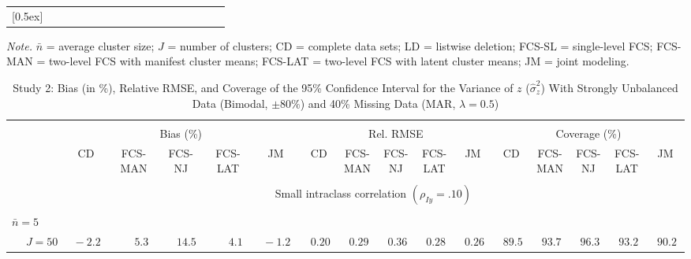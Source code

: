 \begin{sidewaystable}
\begin{threeparttable}
\begin{tabular}{llccccccccccccccc}
[0.5ex]\hline\\[-1.6ex] 
\end{tabular}
\begin{tablenotes}{\footnotesize \textit{Note.} $\bar{n}$ = average cluster size; $J$ = number of clusters; CD = complete data sets; LD = listwise deletion; FCS-SL = single-level FCS; FCS-MAN = two-level FCS with manifest cluster means; FCS-LAT = two-level FCS with latent cluster means; JM = joint modeling.}\end{tablenotes}
\end{threeparttable}
\end{sidewaystable}
\begin{sidewaystable}
\begin{threeparttable}
\setlength{\tabcolsep}{1.0pt}
\renewcommand{\arraystretch}{0.95}
\footnotesize
\caption{\small Study 2: Bias (in \%), Relative RMSE, and Coverage of the 95\% Confidence Interval for the Variance of $z$ ($\hat\sigma_z^2$) With Strongly Unbalanced Data (Bimodal, $\pm 80\%$) and 40\% Missing Data (MAR, $\lambda=0.5$)}
\begin{tabular}{llccccccccccccccc}
\hline\\[-1.8ex]
& & \multicolumn{5}{c}{Bias (\%)} & \multicolumn{5}{c}{Rel. RMSE} & \multicolumn{5}{c}{Coverage (\%)} \\ \cmidrule(r){3-7}\cmidrule(r){8-12}\cmidrule(r){13-17}
 &  & CD & \makecell{FCS-\\MAN} & \makecell{FCS-\\NJ} & \makecell{FCS-\\LAT} & JM & CD & \makecell{FCS-\\MAN} & \makecell{FCS-\\NJ} & \makecell{FCS-\\LAT} & JM & CD & \makecell{FCS-\\MAN} & \makecell{FCS-\\NJ} & \makecell{FCS-\\LAT} & \multicolumn{1}{c}{JM} \\ 
[0.4ex]\hline\\[-1.8ex]
& & \multicolumn{15}{c}{Small intraclass correlation $(\rho_{Iy}=.10)$} \\[0.6ex]\hline\\[-1.8ex]
\multicolumn{4}{l}{$\bar{n}=5$} \\  & \nopagebreak $\;J=50$  & $\phantom{0}{-}2.2\phantom{0}$ & $\phantom{0}\phantom{-}5.3\phantom{0}$ & $\phantom{-}14.5\phantom{0}$ & $\phantom{0}\phantom{-}4.1\phantom{0}$ & $\phantom{0}{-}1.2\phantom{0}$ & $\phantom{0}0.20\phantom{0}$ & $\phantom{0}0.29\phantom{0}$ & $\phantom{0}0.36\phantom{0}$ & $\phantom{0}0.28\phantom{0}$ & $\phantom{0}0.26\phantom{0}$ & $\phantom{0}89.5\phantom{0}$ & $\phantom{0}93.7\phantom{0}$ & $\phantom{0}96.3\phantom{0}$ & $\phantom{0}93.2\phantom{0}$ & $\phantom{0}90.2\phantom{0}$ \\

\end{tabular}
\end{threeparttable}
\end{sidewaystable}
